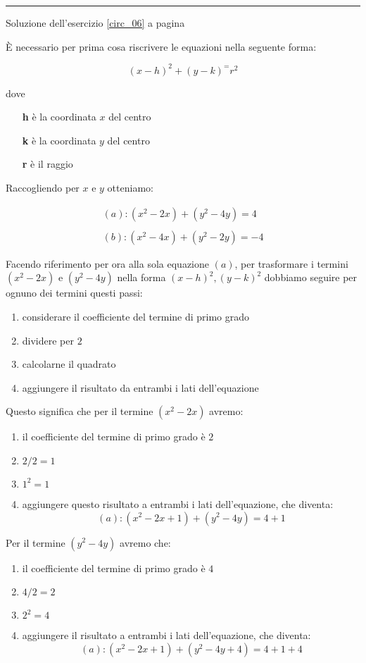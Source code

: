 \vspace{1cm}
\hrule
\vspace{1cm}


Soluzione dell'esercizio \ref{circ_06} a pagina \pageref{circ_06}\label{circs_06}

È necessario per prima cosa riscrivere le equazioni nella seguente forma:

\[
(x-h)^2+(y-k)^=r^2
\]

dove 
\begin{itemize}
\item[\textbf{h}] è la coordinata $x$ del centro
\item[\textbf{k}] è la coordinata $y$ del centro
\item[\textbf{r}] è il raggio
\end{itemize}

Raccogliendo per $x$ e $y$ otteniamo: 

\[
\begin{split}
(a): (x^2-2x)+(y^2-4y)=4 \\
\\
(b): (x^2-4x)+(y^2-2y)=-4
\end{split}
\]

Facendo riferimento per ora alla sola equazione $(a)$, per trasformare
i termini $(x^2-2x)$ e $(y^2-4y)$ nella forma $(x-h)^2, (y-k)^2$ dobbiamo
seguire per ognuno dei termini questi passi:

\begin{enumerate}
\item considerare il coefficiente del termine di primo grado
\item dividere per $2$
\item calcolarne il quadrato
\item aggiungere il risultato da entrambi i lati dell'equazione
\end{enumerate}

Questo significa che per il termine $(x^2-2x)$ avremo:

\begin{enumerate}
\item il coefficiente del termine di primo grado è $2$
\item $2/2=1$
\item $1^2=1$
\item aggiungere questo risultato a entrambi i lati dell'equazione, che diventa:
\[
(a): (x^2-2x+1)+(y^2-4y)=4+1
\]
\end{enumerate}

Per il termine $(y^2-4y)$ avremo che:
\begin{enumerate}
\item il coefficiente del termine di primo grado è $4$
\item $4/2=2$
\item $2^2=4$
\item aggiungere il risultato a entrambi i lati dell'equazione, che diventa:
\[
(a): (x^2-2x+1)+(y^2-4y+4)=4+1+4
\]
\end{enumerate}

